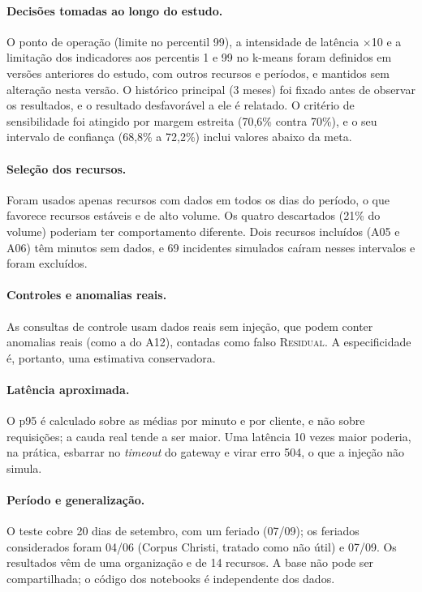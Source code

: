 \documentclass[sigconf,nonacm]{acmart}
\newcommand{\Residual}{\textsc{Residual}\xspace}
\begin{document}
\paragraph{Decisões tomadas ao longo do estudo.} O ponto de operação (limite no percentil 99), a intensidade de latência $\times$10 e a limitação dos indicadores aos percentis 1 e 99 no k-means foram definidos em versões anteriores do estudo, com outros recursos e períodos, e mantidos sem alteração nesta versão. O histórico principal (3 meses) foi fixado antes de observar os resultados, e o resultado desfavorável a ele é relatado. O critério de sensibilidade foi atingido por margem estreita (70,6\% contra 70\%), e o seu intervalo de confiança (68,8\% a 72,2\%) inclui valores abaixo da meta.

\paragraph{Seleção dos recursos.} Foram usados apenas recursos com dados em todos os dias do período, o que favorece recursos estáveis e de alto volume. Os quatro descartados (21\% do volume) poderiam ter comportamento diferente. Dois recursos incluídos (A05 e A06) têm minutos sem dados, e 69 incidentes simulados caíram nesses intervalos e foram excluídos.

\paragraph{Controles e anomalias reais.} As consultas de controle usam dados reais sem injeção, que podem conter anomalias reais (como a do A12), contadas como falso \Residual. A especificidade é, portanto, uma estimativa conservadora.

\paragraph{Latência aproximada.} O p95 é calculado sobre as médias por minuto e por cliente, e não sobre requisições; a cauda real tende a ser maior. Uma latência 10 vezes maior poderia, na prática, esbarrar no \emph{timeout} do gateway e virar erro 504, o que a injeção não simula.

\paragraph{Período e generalização.} O teste cobre 20 dias de setembro, com um feriado (07/09); os feriados considerados foram 04/06 (Corpus Christi, tratado como não útil) e 07/09. Os resultados vêm de uma organização e de 14 recursos. A base não pode ser compartilhada; o código dos notebooks é independente dos dados.
\end{document}
